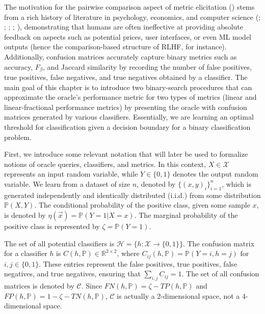 \documentclass[
  letterpaper,
  numbers=noenddot,
  DIV=11]{scrreprt}
\theoremstyle{definition}
\theoremstyle{plain}
\theoremstyle{plain}
\theoremstyle{remark}
\begin{document}
The motivation for the pairwise comparison aspect of metric elicitation
() stems
from a rich history of literature in psychology, economics, and computer
science (;
; ; ;
), demonstrating that
humans are often ineffective at providing absolute feedback on aspects
such as potential prices, user interfaces, or even ML model outputs
(hence the comparison-based structure of RLHF, for instance).
Additionally, confusion matrices accurately capture binary metrics such
as accuracy, \(F_\beta\), and Jaccard similarity by recording the number
of false positives, true positives, false negatives, and true negatives
obtained by a classifier. The main goal of this chapter is to introduce
two binary-search procedures that can approximate the oracle's
performance metric for two types of metrics (linear and
linear-fractional performance metrics) by presenting the oracle with
confusion matrices generated by various classifiers. Essentially, we are
learning an optimal threshold for classification given a decision
boundary for a binary classification problem.

First, we introduce some relevant notation that will later be used to
formalize notions of oracle queries, classifiers, and metrics. In this
context, \(X \in \mathcal{X}\) represents an input random variable,
while \(Y \in \{0, 1\}\) denotes the output random variable. We learn
from a dataset of size \(n\), denoted by \(\{(x, y)_i\}^n_{i=1}\), which
is generated independently and identically distributed (i.i.d.) from
some distribution \(\mathbb{P}(X, Y)\). The conditional probability of
the positive class, given some sample \(x\), is denoted by
\(\eta(\vec{x}) = \mathbb{P}(Y=1 | X=x)\). The marginal probability of
the positive class is represented by \(\zeta = \mathbb{P}(Y=1)\).

The set of all potential classifiers is
\(\mathcal{H} = \{h : \mathcal{X} \rightarrow \{0,1\}\}\). The confusion
matrix for a classifier \(h\) is
\(C(h, \mathbb{P}) \in \mathbb{R}^{2 \times 2}\), where
\(C_{ij}(h, \mathbb{P}) = \mathbb{P}(Y=i, h=j)\) for
\(i, j \in \{0,1\}\). These entries represent the false positives, true
positives, false negatives, and true negatives, ensuring that
\(\sum_{i,j}C_{ij}=1\). The set of all confusion matrices is denoted by
\(\mathcal{C}\). Since \(FN(h, \mathbb{P}) = \zeta - TP(h, \mathbb{P})\)
and \(FP(h, \mathbb{P}) = 1 - \zeta - TN(h, \mathbb{P})\),
\(\mathcal{C}\) is actually a 2-dimensional space, not a 4-dimensional
space.
\end{document}

